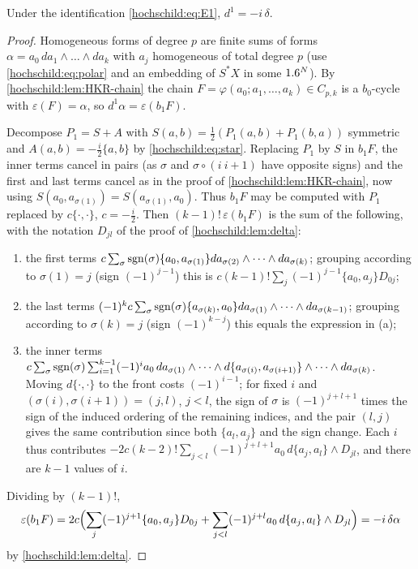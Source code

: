 \begin{proposition}\label{hochschild:prop:d1}
Under the identification \eqref{hochschild:eq:E1}, $d^1=-i\,\delta$.
\end{proposition}
\begin{proof}
Homogeneous forms of degree $p$ are finite sums of forms
$\alpha=a_0\,da_1\wedge\dots\wedge da_k$ with $a_j$ homogeneous of total
degree $p$ (use \eqref{hochschild:eq:polar} and an embedding of $S^*X$ in
some $1.6^N$). By \cref{hochschild:lem:HKR-chain} the chain
$F=\varphi(a_0;a_1,\dots,a_k)\in C_{p,k}$ is a $b_0$-cycle with
$\varepsilon(F)=\alpha$, so $d^1\alpha=\varepsilon(b_1F)$.

Decompose $P_1=S+A$ with $S(a,b)=\frac12(P_1(a,b)+P_1(b,a))$ symmetric and
$A(a,b)=-\frac i2\{a,b\}$ by \eqref{hochschild:eq:star}. Replacing $P_1$ by
$S$ in $b_1F$, the inner terms cancel in pairs (as $\sigma$ and
$\sigma\circ(i\ i{+}1)$ have opposite signs) and the first and last terms
cancel as in the proof of \cref{hochschild:lem:HKR-chain}, now using
$S(a_0,a_{\sigma(1)})=S(a_{\sigma(1)},a_0)$. Thus $b_1F$ may be computed with
$P_1$ replaced by $c\{\cdot,\cdot\}$, $c=-\frac i2$. Then $(k-1)!\,\varepsilon(b_1F)$
is the sum of the following, with the notation $D_{jl}$ of the proof of \cref{hochschild:lem:delta}:
\begin{enumerate}[label=(\alph*)]
\item the first terms $c\sum_\sigma\operatorname{sgn}(\sigma)\{a_0,a_{\sigma(1)}\}
da_{\sigma(2)}\wedge\dots\wedge da_{\sigma(k)}$; grouping according to
$\sigma(1)=j$ (sign $(-1)^{j-1}$) this is $c(k-1)!\sum_j(-1)^{j-1}\{a_0,a_j\}D_{0j}$;
\item the last terms $(-1)^kc\sum_\sigma\operatorname{sgn}(\sigma)\{a_{\sigma(k)},a_0\}
da_{\sigma(1)}\wedge\dots\wedge da_{\sigma(k-1)}$; grouping according to
$\sigma(k)=j$ (sign $(-1)^{k-j}$) this equals the expression in (a);
\item the inner terms $c\sum_\sigma\operatorname{sgn}(\sigma)\sum_{i=1}^{k-1}(-1)^ia_0\,
da_{\sigma(1)}\wedge\dots\wedge d\{a_{\sigma(i)},a_{\sigma(i+1)}\}\wedge\dots
\wedge da_{\sigma(k)}$. Moving $d\{\cdot,\cdot\}$ to the front costs
$(-1)^{i-1}$; for fixed $i$ and $(\sigma(i),\sigma(i+1))=(j,l)$, $j<l$, the
sign of $\sigma$ is $(-1)^{j+l+1}$ times the sign of the induced ordering of
the remaining indices, and the pair $(l,j)$ gives the same contribution since
both $\{a_l,a_j\}$ and the sign change. Each $i$ thus contributes
$-2c(k-2)!\sum_{j<l}(-1)^{j+l+1}a_0\,d\{a_j,a_l\}\wedge D_{jl}$, and there are
$k-1$ values of $i$.
\end{enumerate}
Dividing by $(k-1)!$,
\begin{equation*}
  \varepsilon(b_1F)=2c\Bigl(\sum_j(-1)^{j+1}\{a_0,a_j\}D_{0j}
  +\sum_{j<l}(-1)^{j+l}a_0\,d\{a_j,a_l\}\wedge D_{jl}\Bigr)=-i\,\delta\alpha
\end{equation*}
by \cref{hochschild:lem:delta}.
\end{proof}

